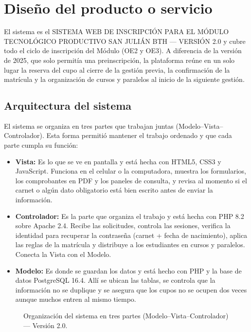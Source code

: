 \section{Diseño del producto o servicio}
\label{sec:diseno}

El sistema es el SISTEMA WEB DE INSCRIPCIÓN PARA EL MÓDULO TECNOLÓGICO PRODUCTIVO SAN JULIÁN BTH --- VERSIÓN 2.0 y cubre todo el ciclo de inscripción del Módulo (OE2 y OE3). A diferencia de la versión de 2025, que solo permitía una preinscripción, la plataforma reúne en un solo lugar la reserva del cupo al cierre de la gestión previa, la confirmación de la matrícula y la organización de cursos y paralelos al inicio de la siguiente gestión.

\subsection{Arquitectura del sistema}

El sistema se organiza en tres partes que trabajan juntas (Modelo--Vista--Controlador). Esta forma permitió mantener el trabajo ordenado y que cada parte cumpla su función:

\begin{itemize}
    \item \textbf{Vista:} Es lo que se ve en pantalla y está hecha con HTML5, CSS3 y JavaScript. Funciona en el celular o la computadora, muestra los formularios, los comprobantes en PDF y los paneles de consulta, y revisa al momento si el carnet o algún dato obligatorio está bien escrito antes de enviar la información.
    \item \textbf{Controlador:} Es la parte que organiza el trabajo y está hecha con PHP 8.2 sobre Apache 2.4. Recibe las solicitudes, controla las sesiones, verifica la identidad para recuperar la contraseña (carnet + fecha de nacimiento), aplica las reglas de la matrícula y distribuye a los estudiantes en cursos y paralelos. Conecta la Vista con el Modelo.
    \item \textbf{Modelo:} Es donde se guardan los datos y está hecho con PHP y la base de datos PostgreSQL 16.4. Allí se ubican las tablas, se controla que la información no se duplique y se asegura que los cupos no se ocupen dos veces aunque muchos entren al mismo tiempo.
\end{itemize}

\begin{figure}[htbp]
    \centering
    \caption{Organización del sistema en tres partes (Modelo--Vista--Controlador) — Versión 2.0.}
    \label{fig:arquitectura_mvc}
    \label{fig:arquitectura_tres_capas}
    \resizebox{0.96\textwidth}{!}{%
        
    }
\end{figure}

